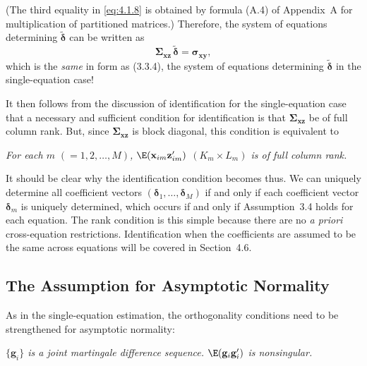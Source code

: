 (The third equality in \eqref{eq:4.1.8} is obtained by formula (A.4) of Appendix~A
for multiplication of partitioned matrices.) Therefore, the system of equations
determining $\tilde{\boldsymbol{\delta}}$ can be written as
\begin{equation}
\boldsymbol{\Sigma}_{\mathbf{x}\mathbf{z}}\, \tilde{\boldsymbol{\delta}}
= \boldsymbol{\sigma}_{\mathbf{x}\mathbf{y}},
\label{eq:4.1.10}
\end{equation}
which is the \textit{same} in form as (3.3.4), the system of equations determining
$\tilde{\boldsymbol{\delta}}$ in the single-equation case!

It then follows from the discussion of identification for the single-equation case
that a necessary and sufficient condition for identification is that
$\boldsymbol{\Sigma}_{\mathbf{x}\mathbf{z}}$ be of full column rank.
But, since $\boldsymbol{\Sigma}_{\mathbf{x}\mathbf{z}}$ is block diagonal,
this condition is equivalent to

\begin{assumption}
\label{ass:4.4}
\textit{For each $m$ $(= 1, 2, \ldots, M)$,
$\E(\mathbf{x}_{im} \mathbf{z}_{im}')$ $(K_m \times L_m)$
is of full column rank.}
\end{assumption}

It should be clear why the identification condition becomes thus. We can uniquely
determine all coefficient vectors $(\boldsymbol{\delta}_1, \ldots, \boldsymbol{\delta}_M)$
if and only if each coefficient vector $\boldsymbol{\delta}_m$ is uniquely determined, which occurs
if and only if Assumption~3.4 holds for each equation. The rank condition is this
simple because there are no \textit{a priori} cross-equation restrictions. Identification
when the coefficients are assumed to be the same across equations will be covered
in Section~4.6.

\subsection*{The Assumption for Asymptotic Normality}

As in the single-equation estimation, the orthogonality conditions need to be
strengthened for asymptotic normality:

\begin{assumption}
\label{ass:4.5}
\textit{$\{\mathbf{g}_i\}$ is a joint martingale difference sequence.
$\E(\mathbf{g}_i \mathbf{g}_i')$ is nonsingular.}
\end{assumption}

